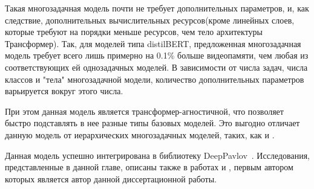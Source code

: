 Такая многозадачная модель почти не требует дополнительных параметров, и, как следствие, дополнительных вычислительных ресурсов(кроме линейных слоев, которые требуют на порядки меньше ресурсов, чем тело архитектуры Трансформер). Так, для моделей типа distilBERT, предложенная многозадачная модель требует всего лишь примерно на  0.1\% больше видеопамяти, чем любая из соответствующих ей однозадачных моделей. В зависимости от числа задач, числа классов и "тела" многозадачной модели, количество дополнительных параметров варьируется вокруг этого числа. 

При этом данная модель является трансформер-агностичной, что позволяет быстро подставлять в нее разные типы базовых моделей. Это выгодно отличает данную модель от иерархических многозадачных моделей, таких, как \cite{stickland_2019} и \cite{TaskEmbedded2021}. 

Данная модель успешно интегрирована в библиотеку DeepPavlov~\cite{dp_2023}. Исследования, представленные в данной главе, описаны также в работах \cite{rumtl} и \cite{enmtl}, первым автором которых является автор данной диссертационной работы.

